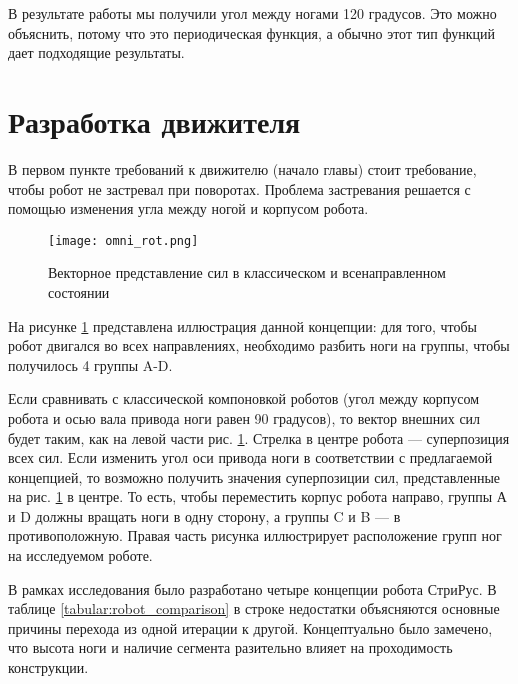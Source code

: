 В результате работы мы получили угол между ногами 120 градусов. Это можно объяснить, потому что это периодическая функция, а обычно этот тип функций дает подходящие результаты.

\section{Разработка движителя}

В первом пункте требований к движителю (начало главы) стоит требование, чтобы робот не застревал при поворотах. Проблема застревания решается с помощью изменения угла между ногой и корпусом робота.

\begin{figure}[H]
    \centering\texttt{[image: omni\_rot.png]}
    \caption{Векторное представление сил в классическом и всенаправленном состоянии}
    \label{fig:omnidirection}
\end{figure}

На рисунке \ref{fig:omnidirection} представлена иллюстрация данной концепции: для того, чтобы робот двигался во всех направлениях, необходимо разбить ноги на группы, чтобы получилось 4 группы A-D.

Если сравнивать с классической компоновкой роботов (угол между корпусом робота и осью вала привода ноги равен 90 градусов), то вектор внешних сил будет таким, как на левой части рис. \ref{fig:omnidirection}. Стрелка в центре робота — суперпозиция всех сил. Если изменить угол оси привода ноги в соответствии с предлагаемой концепцией, то возможно получить значения суперпозиции сил, представленные на рис. \ref{fig:omnidirection} в центре. То есть, чтобы переместить корпус робота направо, группы А и D должны вращать ноги в одну сторону, а группы C и B — в противоположную. Правая часть рисунка иллюстрирует расположение групп ног на исследуемом роботе. 

В рамках исследования было разработано четыре концепции робота СтриРус. В таблице \ref{tabular:robot_comparison} в строке недостатки объясняются основные причины перехода из одной итерации к другой. Концептуально было замечено, что высота ноги и наличие сегмента разительно влияет на проходимость конструкции.


